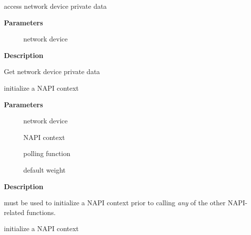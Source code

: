 \documentclass[a4paper,8pt,english]{sphinxmanual}
\begin{document}
\begin{fulllineitems}
\label{networking/kapi:c.netdev_priv}
access network device private data

\end{fulllineitems}


\textbf{Parameters}
\begin{description}
\item[{}] \leavevmode
network device

\end{description}

\textbf{Description}

Get network device private data

\begin{fulllineitems}
\label{networking/kapi:c.netif_napi_add}
initialize a NAPI context

\end{fulllineitems}


\textbf{Parameters}
\begin{description}
\item[{}] \leavevmode
network device

\item[{}] \leavevmode
NAPI context

\item[{}] \leavevmode
polling function

\item[{}] \leavevmode
default weight

\end{description}

\textbf{Description}

{\hyperref[networking/kapi:c.netif_napi_add]{\emph{}}} must be used to initialize a NAPI context prior to calling
\emph{any} of the other NAPI-related functions.

\begin{fulllineitems}
\label{networking/kapi:c.netif_tx_napi_add}
initialize a NAPI context

\end{fulllineitems}
\end{document}
